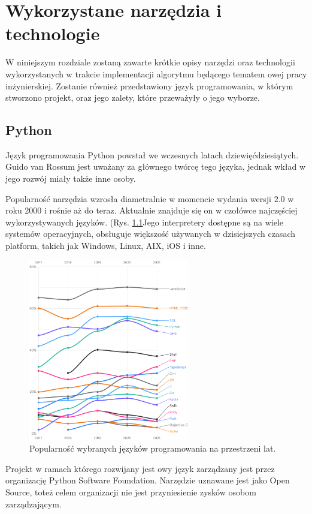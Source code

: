 \chapter{Wykorzystane narzędzia i technologie}
\label{cha:wykorzystaneNarzedziaITechnologie}
W niniejszym rozdziale zostaną zawarte krótkie opisy narzędzi oraz technologii wykorzystanych w trakcie implementacji algorytmu będącego tematem owej pracy inżynierskiej. Zostanie również przedstawiony język programowania, w którym stworzono projekt, oraz jego zalety, które przeważyły o jego wyborze. 
\section{Python}
Język programowania Python \cite{PythonWiki} powstał we wczesnych latach dziewięćdziesiątych. Guido van Rossum jest uważany za głównego twórcę tego języka, jednak wkład w jego rozwój miały także inne osoby. 

Popularność narzędzia wzrosła diametralnie w momencie wydania wersji $2.0$ w roku 2000 i rośnie aż do teraz. Aktualnie znajduje się on w czołówce najczęściej wykorzystywanych języków. (Rys. \ref{fig:programmingLang}Jego interpretery dostępne są na wiele systemów operacyjnych, obsługuje większość używanych w dzisiejszych czasach platform, takich jak Windows, Linux, AIX, iOS i inne.

\begin{figure}[h]
	\centering
	\includegraphics[width=7cm]{python.png}
	\caption{Popularność wybranych języków programowania na przestrzeni lat.} 
	\label{fig:programmingLang}
\end{figure}

Projekt w ramach którego rozwijany jest owy język zarządzany jest przez organizację Python Software Foundation. Narzędzie uznawane jest jako Open Source, toteż celem organizacji nie jest przyniesienie zysków osobom zarządzającym. 

